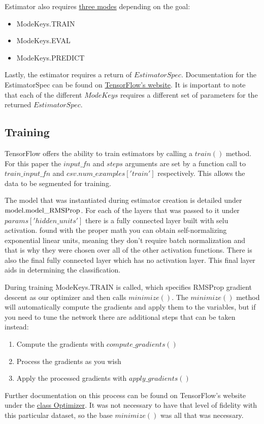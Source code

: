 \documentclass{article}
\begin{document}
    Estimator also requires \href{https://www.tensorflow.org/versions/r1.2/api_docs/python/tf/estimator/ModeKeys}{three modes} depending on the goal:
    \begin{itemize}
    \item ModeKeys.TRAIN
    \item ModeKeys.EVAL
    \item ModeKeys.PREDICT
    \end{itemize}
    Lastly, the estimator requires a return of $EstimatorSpec$. Documentation 
    for the EstimatorSpec can be found on \href{https://www.tensorflow.org/api_docs/python/tf/estimator/EstimatorSpec}{TensorFlow's website}. It is important to note 
    that each of the different $ModeKeys$ requires a different set of 
    parameters for the returned $EstimatorSpec$.

\subsection{Training}
    TensorFlow offers the ability to train estimators by calling a $train()$ 
    method. For this paper the $input\_fn$ and $steps$ arguments are set by a 
    function call to $train\_input\_fn$ and $csv.num\_examples['train']$ 
    respectively. This allows the data to be segmented for training.

    The model that was instantiated during estimator creation is detailed under
    $\textnormal{model.model\_RMSProp}$. For each of the layers that was passed 
    to it under $params['hidden\_units']$ there is a fully connected layer 
    built with selu activation. \citet{selu} found with the proper math you can 
    obtain self-normalizing exponential linear units, meaning they don't 
    require batch normalization and that is why they were chosen over all of 
    the other activation functions. There is also the final fully connected 
    layer which has no activation layer. This final layer aids in determining 
    the classification.

    During training ModeKeys.TRAIN is called, which specifies RMSProp gradient 
    descent as our optimizer and then calls $minimize()$. The $minimize()$ 
    method will automatically compute the gradients and apply them to the 
    variables, but if you need to tune the network there are additional steps 
    that can be taken instead:
    \begin{enumerate}
        \item Compute the gradients with $compute\_gradients()$
        \item Process the gradients as you wish
        \item Apply the processed gradients with $apply\_gradients()$
    \end{enumerate}
    Further documentation on this process can be found on TensorFlow's website 
    under the \href{https://www.tensorflow.org/api_docs/python/tf/train/Optimizer}
    {class Optimizer}. It was not necessary to have that level of fidelity with 
    this particular dataset, so the base $minimize()$ was all that was 
    necessary.
\end{document}
